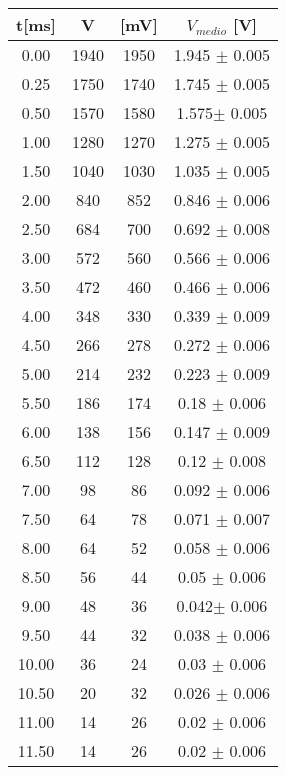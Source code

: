 \documentclass[a4paper]{article}
\theoremstyle{definition}
\begin{document}
\begin{table}[!htbp]
{\begin{minipage}{.7\linewidth}
\begin{tabular}{c|cc|c}
        t[ms] & V & [mV] & \(V_{medio}\) [V]\\
        \hline
        \hline
        0.00& 1940& 1950& 1.945  \(\pm\) 0.005\\
        \hline
        0.25 &1750& 1740& 1.745 \(\pm\) 0.005\\
        \hline
        0.50& 1570& 1580 & 1.575\(\pm\) 0.005\\
        \hline
        1.00 & 1280& 1270&  1.275 \(\pm\) 0.005\\
        \hline
        1.50& 1040& 1030&  1.035  \(\pm\) 0.005\\
        \hline
        2.00& 840& 852&  0.846   \(\pm\) 0.006\\
        \hline
        2.50& 684& 700&   0.692   \(\pm\) 0.008\\
        \hline
        3.00&572& 560   & 0.566  \(\pm\) 0.006\\
        \hline
       3.50& 472& 460 & 0.466   \(\pm\) 0.006\\
       \hline
       4.00&  348& 330 &  0.339 \(\pm\) 0.009\\
       \hline
       4.50& 266& 278&  0.272   \(\pm\) 0.006\\
       \hline
       5.00 & 214& 232&  0.223  \(\pm\) 0.009\\
       \hline
       5.50 & 186& 174 & 0.18  \(\pm\) 0.006\\
       \hline
       6.00 & 138& 156  &  0.147 \(\pm\) 0.009\\
       \hline
       6.50 & 112& 128  &0.12  \(\pm\) 0.008\\
       \hline
       7.00 & 98& 86  & 0.092  \(\pm\) 0.006\\
       \hline
       7.50 & 64& 78 & 0.071  \(\pm\) 0.007\\
       \hline
       8.00 & 64& 52   & 0.058 \(\pm\)  0.006\\
       \hline
       8.50& 56& 44  & 0.05  \(\pm\) 0.006\\
       \hline
       9.00& 48& 36 &  0.042\(\pm\)  0.006\\
       \hline
       9.50 &  44& 32 & 0.038  \(\pm\)  0.006 \\
       \hline
       10.00 &36& 24  & 0.03   \(\pm\) 0.006\\
       \hline
       10.50 & 20& 32&  0.026  \(\pm\) 0.006\\
       \hline
       11.00 & 14& 26 & 0.02  \(\pm\) 0.006\\
       \hline
       11.50 & 14& 26  & 0.02  \(\pm\) 0.006\\

\end{tabular}
\end{minipage}}
\end{table}
\end{document}
